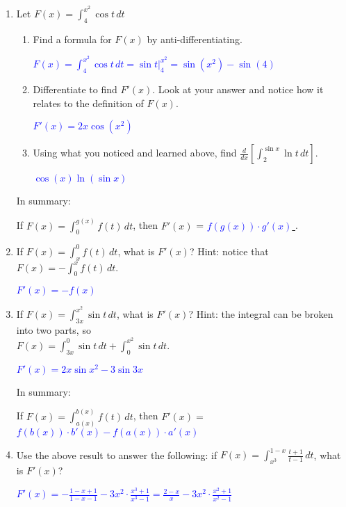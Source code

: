 \documentclass[letterpaper,11pt]{article}
\def\ds{\displaystyle}
\newcommand{\usol}[1]{\underline{\hspace{.1 in} \textcolor{blue}{#1} \hspace{.1 in}}}
\newcommand{\sol}[1]{\textcolor{blue}{#1}}
\newcommand{\usol}[1]{\underline{\hspace{.1 in} \textcolor{white}{#1} \hspace{.1 in}}}
\newcommand{\sol}[1]{\textcolor{white}{#1}}
\begin{document}
\begin{enumerate}
\item Let $\ds F(x)= \int_4^{x^2} \cos{t} \,dt$

\begin{enumerate}
\item Find a formula for $F(x)$ by anti-differentiating.

\sol{$\ds F(x)=\int_4^{x^2} \cos{t} \,dt = \sin{t} \Big|_4^{x^2} = \sin{\left( x^2 \right)}-\sin{(4)}$}
\vfill

\item Differentiate to find $F'(x)$. Look at your answer and notice how it relates to the definition of $F(x)$.

\sol{$F'(x)=2x \cos \left( x^2 \right)$}
\vfill

\newpage
\item Using what you noticed and learned above, find $\ds \frac{d}{dx} \left[\int_{2}^{\sin{x}} \ln{t} \,dt \right]$.

\sol{$\cos{(x)} \ln{( \sin x)}$}
\vfill
\end{enumerate}

In summary:
\begin{framed}
If $\ds F(x)=\int_0^{g(x)} f(t) \,dt$, then  $F'(x)$ = \usol{$f(g(x))\cdot g'(x)$}.
\end{framed}

\vfill

\item If $\ds F(x)=\int_x^{0} f(t) \,dt$, what is $F'(x)$? Hint: notice that $\ds F(x) = -\int_0^{x} f(t) \,dt$.

\sol{$F'(x)=-f(x)$}
\vfill

\item  If $\ds F(x)=\int_{3x}^{x^2} \sin{t} \,dt$, what is $F'(x)$?  Hint: the integral can be broken into two parts, so \\
$\ds F(x)=\int_{3x}^{0} \sin{t} \,dt + \int_{0}^{x^2} \sin{t} \,dt$.

\sol{$\ds F'(x) = 2x\sin{x^2} - 3\sin{3x}$}
\vfill

In summary:
\begin{framed}
If $\ds F(x)=\int_{a(x)}^{b(x)} f(t) \,dt$, then $F'(x)=$ \usol{ $f(b(x)) \cdot b'(x) -f(a(x))\cdot a'(x)$}
\end{framed}
\vfill

\item Use the above result to answer the following: if $\ds F(x)=\int_{x^3}^{1-x} \frac{t+1}{t-1} \,dt$, what is $F'(x)$?

\sol{$\ds F'(x)=-\frac{1-x+1}{1-x-1}-3x^2 \cdot \frac{x^3+1}{x^3-1}=\frac{2-x}{x}-3x^2 \cdot \frac{x^2+1}{x^2-1}$}
\vfill



\end{enumerate}
\end{document}
